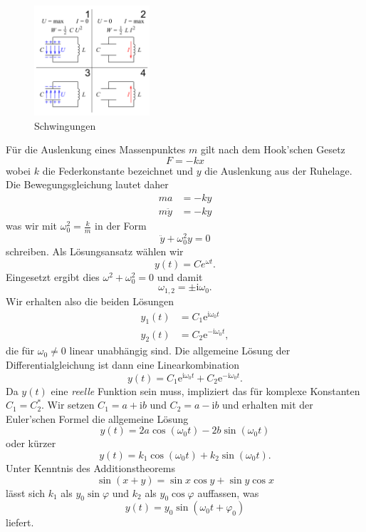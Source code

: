 \documentclass[%
11pt,%
twoside,%
titlepage,%
swissgerman,%
headsepline%
]{scrartcl}
\theoremstyle{definition}
\theoremstyle{plain}
\begin{document}
\begin{figure}
\vspace{20pt}
  \begin{center}
    \includegraphics[width=0.382\textwidth]{pictures/schwing}
  \end{center}
\caption{Schwingungen}
\vspace{-50pt}
\end{figure}

Für
die Auslenkung eines Massenpunktes $m$ gilt nach dem Hook'schen Gesetz
$$F=-kx$$
wobei $k$ die Federkonstante bezeichnet und $y$ die Auslenkung aus der Ruhelage. Die Bewegungsgleichung lautet daher
\begin{align*}
ma &= -ky\\
m\ddot{y} &= -ky
\end{align*}
was wir mit $\omega_0^2=\frac{k}{m}$ in der Form
$$\ddot{y}+\omega_0^2 y=0$$
schreiben. Als Lösungsansatz wählen wir
$$y(t)=Ce^{\omega t}.$$
Eingesetzt ergibt dies $\omega^2+\omega_0^2=0$ und damit
$$\omega_{1,2}=\pm \mathrm{i}\omega_0.$$
Wir erhalten also die beiden Lösungen
\begin{align*}
y_1(t) &= C_1\mathrm{e}^{\mathrm{i}\omega_0 t}\\
y_2(t) &= C_2\mathrm{e}^{-\mathrm{i}\omega_0 t},
\end{align*}
die für $\omega_0\neq0$ linear unabhängig sind. Die allgemeine Lösung der Differentialgleichung ist dann eine Linearkombination
$$y(t)=C_1\mathrm{e}^{\mathrm{i}\omega_0 t}+ C_2\mathrm{e}^{-\mathrm{i}\omega_0 t}.$$
Da $y(t)$ eine \emph{reelle} Funktion sein muss, impliziert das für komplexe Konstanten $C_1=C_2^*$. Wir setzen $C_1=a+\mathrm{i}b$ und $C_2=a-\mathrm{i}b$ und erhalten mit der Euler'schen Formel die allgemeine Lösung
$$y(t)=2a\cos(\omega_0 t)-2b\sin(\omega_0 t)$$
oder kürzer
$$y(t)=k_1\cos(\omega_0 t)+k_2\sin(\omega_0 t).$$
Unter Kenntnis des Additionstheorems
$$\sin(x+y)=\sin x\cos y+\sin y\cos x$$
lässt sich $k_1$ als $y_0\sin\varphi$ und $k_2$ als $y_0\cos\varphi$ auffassen, was
$$y(t)=y_0\sin(\omega_0 t+\varphi_0)$$
liefert.
\end{document}

